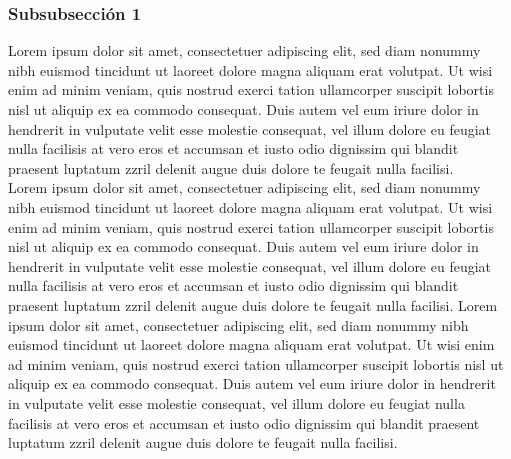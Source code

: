 \documentclass[11pt, letterpaper]{book} %
\begin{document}
\subsubsection{Subsubsección 1}
Lorem ipsum dolor sit amet, consectetuer adipiscing elit, sed diam nonummy nibh euismod tincidunt ut laoreet dolore magna aliquam erat volutpat. Ut wisi enim ad minim veniam, quis nostrud exerci tation ullamcorper suscipit lobortis nisl ut aliquip ex ea commodo consequat. Duis autem vel eum iriure dolor in hendrerit in vulputate velit esse molestie consequat, vel illum dolore eu feugiat nulla facilisis at vero eros et accumsan et iusto odio dignissim qui blandit praesent luptatum zzril delenit augue duis dolore te feugait nulla facilisi.\\[6mm]
Lorem ipsum dolor sit amet, consectetuer adipiscing elit, sed diam nonummy nibh euismod tincidunt ut laoreet dolore magna aliquam erat volutpat. Ut wisi enim ad minim veniam, quis nostrud exerci tation ullamcorper suscipit lobortis nisl ut aliquip ex ea commodo consequat. Duis autem vel eum iriure dolor in hendrerit in vulputate velit esse molestie consequat, vel illum dolore eu feugiat nulla facilisis at vero eros et accumsan et iusto odio dignissim qui blandit praesent luptatum zzril delenit augue duis dolore te feugait nulla facilisi.
\vspace{10mm}
Lorem ipsum dolor sit amet, consectetuer adipiscing elit, sed diam nonummy nibh euismod tincidunt ut laoreet dolore magna aliquam erat volutpat. Ut wisi enim ad minim veniam, quis nostrud exerci tation ullamcorper suscipit lobortis nisl ut aliquip ex ea commodo consequat. Duis autem vel eum iriure dolor in hendrerit in vulputate velit esse molestie consequat, vel illum dolore eu feugiat nulla facilisis at vero eros et accumsan et iusto odio dignissim qui blandit praesent luptatum zzril delenit augue duis dolore te feugait nulla facilisi.
\end{document}
